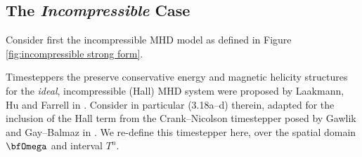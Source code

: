 \subsection*{The \emph{Incompressible} Case}
    Consider first the incompressible MHD model as defined in Figure \ref{fig:incompressible strong form}.

    \line

    Timesteppers the preserve conservative energy and magnetic helicity structures for the \emph{ideal}, incompressible (Hall) MHD system were proposed by Laakmann, Hu and Farrell in \cite{Laakmann_Hu_Farrell_2022}. Consider in particular (3.18a--d) therein, adapted for the inclusion of the Hall term from the Crank--Nicolson timestepper posed by Gawlik and Gay--Balmaz in \cite{Gawlik_Gay--Balmaz_2022}. We re-define this timestepper here, over the spatial domain $\bfOmega$ and interval $T^{n}$.

    \shortline

